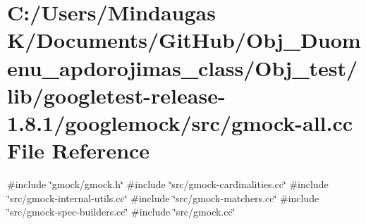 \hypertarget{_obj__test_2lib_2googletest-release-1_88_81_2googlemock_2src_2gmock-all_8cc}{}\section{C\+:/\+Users/\+Mindaugas K/\+Documents/\+Git\+Hub/\+Obj\+\_\+\+Duomenu\+\_\+apdorojimas\+\_\+class/\+Obj\+\_\+test/lib/googletest-\/release-\/1.8.1/googlemock/src/gmock-\/all.cc File Reference}
\label{_obj__test_2lib_2googletest-release-1_88_81_2googlemock_2src_2gmock-all_8cc}
{\ttfamily \#include \char`\"{}gmock/gmock.\+h\char`\"{}}\newline
{\ttfamily \#include \char`\"{}src/gmock-\/cardinalities.\+cc\char`\"{}}\newline
{\ttfamily \#include \char`\"{}src/gmock-\/internal-\/utils.\+cc\char`\"{}}\newline
{\ttfamily \#include \char`\"{}src/gmock-\/matchers.\+cc\char`\"{}}\newline
{\ttfamily \#include \char`\"{}src/gmock-\/spec-\/builders.\+cc\char`\"{}}\newline
{\ttfamily \#include \char`\"{}src/gmock.\+cc\char`\"{}}\newline

